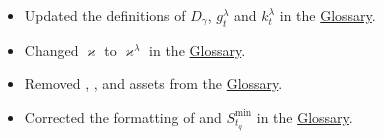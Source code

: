 \documentclass[class=article, crop=false]{standalone}
\begin{document}
\begin{itemize}[topsep=0pt, itemsep=3pt,leftmargin=16pt]
\begin{itemize}
        \item Updated the definitions of $D_{\gamma}$, $g_{t}^{\lambda}$ and $k_{t}^{\lambda}$ in the \hyperlink{subsection.14.11}{Glossary}.
        \item Changed $\varkappa$ to $\varkappa^{\lambda}$ in the \hyperlink{subsection.14.11}{Glossary}.
        \item Removed , ,  and  assets from the \hyperlink{subsection.14.11}{Glossary}. 
        \item Corrected the formatting of  and $S_{t_q}^{\text{min}}$ in the \hyperlink{subsection.14.11}{Glossary}.
    \end{itemize}
\end{itemize}
\end{document}
